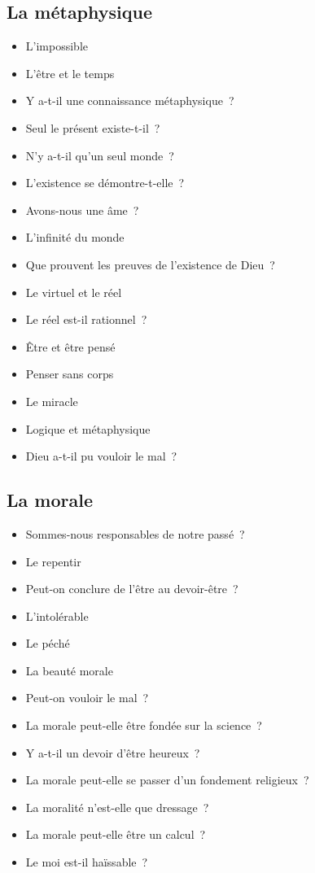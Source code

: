 \documentclass[a4paper,11pt]{article}
\newenvironment{liste}{\begin{itemize}}{\end{itemize}}
\begin{document}
\subsection{La métaphysique}

\begin{liste}
\item L'impossible
\item L'être et le temps
\item Y a-t-il une connaissance métaphysique~?
\item Seul le présent existe-t-il~?
\item N'y a-t-il qu'un seul monde~?
\item L'existence se démontre-t-elle~?
\item Avons-nous une âme~?
\item L'infinité du monde
\item Que prouvent les preuves de l'existence de Dieu~?
\item Le virtuel et le réel
\item Le réel est-il rationnel~?
\item Être et être pensé
\item Penser sans corps
\item Le miracle
\item Logique et métaphysique
\item Dieu a-t-il pu vouloir le mal~?
\end{liste}


\subsection{La morale}

\begin{liste}
\item Sommes-nous responsables de notre passé~?
\item Le repentir
\item Peut-on conclure de l'être au devoir-être~?
\item L'intolérable
\item Le péché
\item La beauté morale
\item Peut-on vouloir le mal~?
\item La morale peut-elle être fondée sur la science~?
\item Y a-t-il un devoir d'être heureux~?
\item La morale peut-elle se passer d'un fondement religieux~?
\item La moralité n'est-elle que dressage~?
\item La morale peut-elle être un calcul~?
\item Le moi est-il haïssable~?
\end{liste}
\end{document}

